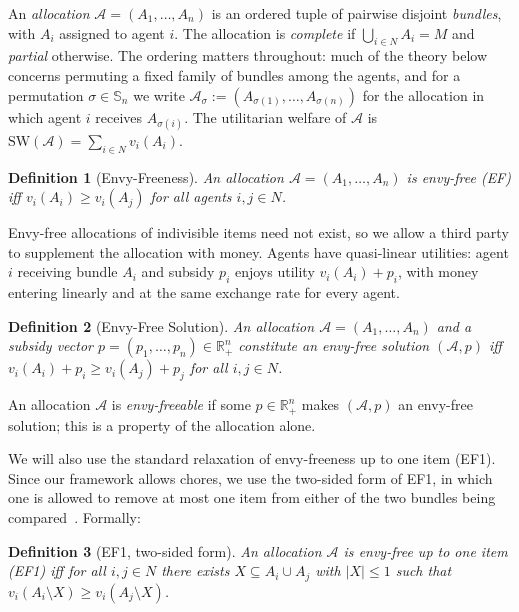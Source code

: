 \documentclass[11pt]{article}
\theoremstyle{plain}
\newtheorem{definition}{Definition}
\theoremstyle{plain}
\newcommand{\agents}{N}                       %
\newcommand{\items}{M}                        %
\newcommand{\alloc}{\mathcal{A}}              %
\newcommand{\bundle}[1]{A_{#1}}
\newcommand{\subsidy}{p}                      %
\newcommand{\SW}{\mathrm{SW}}                 %
\newcommand{\R}{\mathbb{R}}
\newcommand{\abs}[1]{\left\lvert#1\right\rvert}
\begin{document}
An \emph{allocation} $\alloc = (\bundle{1}, \dots, \bundle{n})$ is an ordered tuple of pairwise disjoint \emph{bundles}, with $\bundle{i}$ assigned to agent $i$. The allocation is \emph{complete} if $\bigcup_{i \in \agents} \bundle{i} = \items$ and \emph{partial} otherwise. The ordering matters throughout: much of the theory below concerns permuting a fixed family of bundles among the agents, and for a permutation $\sigma \in \mathbb{S}_n$ we write $\alloc_\sigma := (A_{\sigma(1)}, \dots, A_{\sigma(n)})$ for the allocation in which agent $i$ receives $A_{\sigma(i)}$. The utilitarian welfare of $\alloc$ is $\SW(\alloc) = \sum_{i \in \agents} v_i(\bundle{i})$.

\begin{definition}[Envy-Freeness]
\label{def:ef}
An allocation $\alloc = (\bundle{1},\dots,\bundle{n})$ is \emph{envy-free} (EF) iff $v_i(\bundle{i}) \ge v_i(\bundle{j})$ for all agents $i, j \in \agents$.
\end{definition}

Envy-free allocations of indivisible items need not exist, so we allow a third party to supplement the allocation with money. Agents have quasi-linear utilities: agent $i$ receiving bundle $\bundle{i}$ and subsidy $\subsidy_i$ enjoys utility $v_i(\bundle{i}) + \subsidy_i$, with money entering linearly and at the same exchange rate for every agent.

\begin{definition}[Envy-Free Solution] \label{def:efsolution}
An allocation $\alloc = (\bundle{1},\dots,\bundle{n})$ and a subsidy vector $\subsidy = (\subsidy_1,\dots,\subsidy_n) \in \R^n_{+}$ constitute an \emph{envy-free solution} $(\alloc, \subsidy)$ iff $v_i(\bundle{i}) + \subsidy_i \ge v_i(\bundle{j}) + \subsidy_j$ for all $i, j \in \agents$.
\end{definition}

An allocation $\alloc$ is \emph{envy-freeable} if some $\subsidy \in \R^n_+$ makes $(\alloc,\subsidy)$ an envy-free solution; this is a property of the allocation alone. 

We will also use the standard relaxation of envy-freeness up to one item (EF1). Since our framework allows chores, we use the two-sided form of EF1, in which one is allowed to remove at most one item from either of the two bundles being compared~\cite{kawase2025towards}. Formally:
\begin{definition}[EF1, two-sided form] \label{def:ef1}
An allocation $\alloc$ is \emph{envy-free up to one item} (EF1) iff for all $i, j \in \agents$ there exists $X \subseteq \bundle{i} \cup \bundle{j}$ with $\abs{X} \le 1$ such that $v_i(\bundle{i} \setminus X) \ge v_i(\bundle{j} \setminus X)$.
\end{definition}
\end{document}
